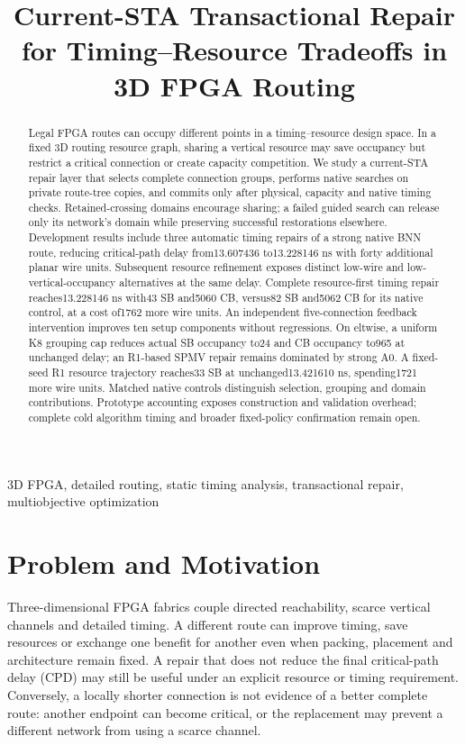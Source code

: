 \documentclass[conference,10pt]{IEEEtran}
\title{Current-STA Transactional Repair for Timing--Resource Tradeoffs in 3D FPGA Routing}
\author{\IEEEauthorblockN{Anonymous development manuscript}}
\begin{document}
\maketitle
\begin{abstract}
Legal FPGA routes can occupy different points in a timing--resource design space. In a fixed 3D routing resource graph, sharing a vertical resource may save occupancy but restrict a critical connection or create capacity competition. We study a current-STA repair layer that selects complete connection groups, performs native searches on private route-tree copies, and commits only after physical, capacity and native timing checks. Retained-crossing domains encourage sharing; a failed guided search can release only its network's domain while preserving successful restorations elsewhere. Development results include three automatic timing repairs of a strong native BNN route, reducing critical-path delay from13.607436 to13.228146 ns with forty additional planar wire units. Subsequent resource refinement exposes distinct low-wire and low-vertical-occupancy alternatives at the same delay. Complete resource-first timing repair reaches13.228146 ns with43 SB and5060 CB, versus82 SB and5062 CB for its native control, at a cost of1762 more wire units. An independent five-connection feedback intervention improves ten setup components without regressions. On eltwise, a uniform K8 grouping cap reduces actual SB occupancy to24 and CB occupancy to965 at unchanged delay; an R1-based SPMV repair remains dominated by strong A0. A fixed-seed R1 resource trajectory reaches33 SB at unchanged13.421610 ns, spending1721 more wire units. Matched native controls distinguish selection, grouping and domain contributions. Prototype accounting exposes construction and validation overhead; complete cold algorithm timing and broader fixed-policy confirmation remain open.
\end{abstract}
\begin{IEEEkeywords}
3D FPGA, detailed routing, static timing analysis, transactional repair, multiobjective optimization
\end{IEEEkeywords}

\section{Problem and Motivation}
Three-dimensional FPGA fabrics couple directed reachability, scarce vertical channels and detailed timing. A different route can improve timing, save resources or exchange one benefit for another even when packing, placement and architecture remain fixed. A repair that does not reduce the final critical-path delay (CPD) may still be useful under an explicit resource or timing requirement. Conversely, a locally shorter connection is not evidence of a better complete route: another endpoint can become critical, or the replacement may prevent a different network from using a scarce channel.
\end{document}
